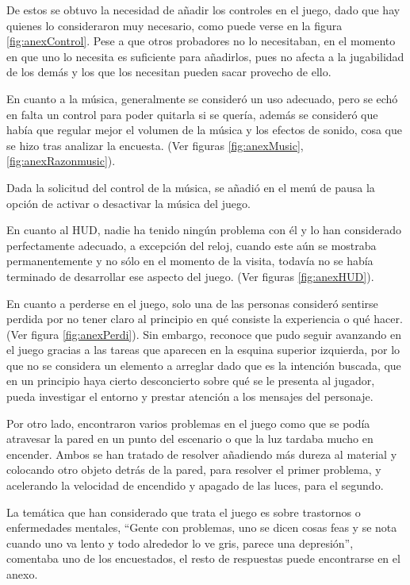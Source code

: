 \documentclass[12pt, a4paper,twoside,titlepage]{book}
\newcommand{\comm}[1]{\todo[linecolor=yellow]{\textsf{#1}}}
\begin{document}
De estos se obtuvo la necesidad de añadir los controles en el juego, dado que hay quienes lo consideraron muy necesario, como puede verse en la figura \ref{fig:anexControl}. Pese a que otros probadores no lo necesitaban, en el momento en que uno lo necesita es suficiente para añadirlos, pues no afecta a la jugabilidad de los demás y los que los necesitan pueden sacar provecho de ello. 

En cuanto a la música, generalmente se consideró un uso adecuado, pero se echó en falta un control para poder quitarla si se quería, además se consideró que había que regular mejor el volumen de la música y los efectos de sonido, cosa que se hizo tras analizar la encuesta. (Ver figuras \ref{fig:anexMusic}, \ref{fig:anexRazonmusic}). 


Dada la solicitud del control de la música, se añadió en el menú de pausa la opción de activar o desactivar la música del juego. 

\comm{añadir imagen de la mejora}


En cuanto al HUD, nadie ha tenido ningún problema con él y lo han considerado perfectamente adecuado, a excepción del reloj, cuando este aún se mostraba permanentemente y no sólo en el momento de la visita, todavía no se había terminado de desarrollar ese aspecto del juego. (Ver figuras \ref{fig:anexHUD}). 

En cuanto a perderse en el juego, solo una de las personas consideró sentirse perdida por no tener claro al principio en qué consiste la experiencia o qué hacer. (Ver figura \ref{fig:anexPerdi}). Sin embargo, reconoce que pudo seguir avanzando en el juego gracias a las tareas que aparecen en la esquina superior izquierda, por lo que no se considera un elemento a arreglar dado que es la intención buscada, que en un principio haya cierto desconcierto sobre qué se le presenta al jugador, pueda investigar el entorno y prestar atención a los mensajes del personaje.

Por otro lado, encontraron varios problemas en el juego como que se podía atravesar la pared en un punto del escenario o que la luz tardaba mucho en encender. Ambos se han tratado de resolver añadiendo más dureza al material y colocando otro objeto detrás de la pared, para resolver el primer problema, y acelerando la velocidad de encendido y apagado de las luces, para el segundo. 

La temática que han considerado que trata el juego es sobre trastornos o enfermedades mentales, ``Gente con problemas, uno se dicen cosas feas y se nota cuando uno va lento y todo alrededor lo ve gris, parece una depresión'', comentaba uno de los encuestados, el resto de respuestas puede encontrarse en el anexo. 
\end{document}
